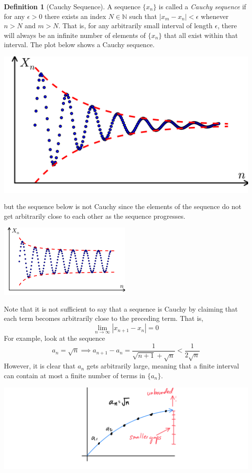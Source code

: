 \documentclass{article}
\theoremstyle{remark}
\theoremstyle{definition}
\newtheorem{definition}{Definition}[section]
\begin{document}
\begin{definition}[Cauchy Sequence]
A sequence $\{x_n\}$ is called a \textit{Cauchy sequence} if for any $\epsilon > 0$ there exists an index $N \in \mathbb{N}$ such that $|x_m - x_n| < \epsilon$ whenever $n > N$ and $m > N$. That is, for any arbitrarily small interval of length $\epsilon$, there will always be an infinite number of elements of $\{x_n\}$ that all exist within that interval. The plot below shows a Cauchy sequence. 
\begin{center}
    \includegraphics[scale=0.18]{img/Cauchy_Example.png}
\end{center}
but the sequence below is not Cauchy since the elements of the sequence do not get arbitrarily close to each other as the sequence progresses. 
\begin{center}
    \includegraphics[scale=0.8]{img/Non_Cauchy_Example.png}
\end{center}
\end{definition}

Note that it is not sufficient to say that a sequence is Cauchy by claiming that each term becomes arbitrarily close to the preceding term. That is, 
\[ \lim_{n \rightarrow \infty} |x_{n+1} - x_{n}| = 0\]
For example, look at the sequence 
\[a_n = \sqrt{n} \implies a_{n+1} - a_{n} = \frac{1}{\sqrt{n+1} + \sqrt{n}} < \frac{1}{2\sqrt{n}}\]
However, it is clear that $a_n$ gets arbitrarily large, meaning that a finite interval can contain at most a finite number of terms in $\{a_n\}$. 
\begin{center}
    \includegraphics[scale=0.3]{img/Square_Root_Sequence.PNG}
\end{center}
\end{document}
